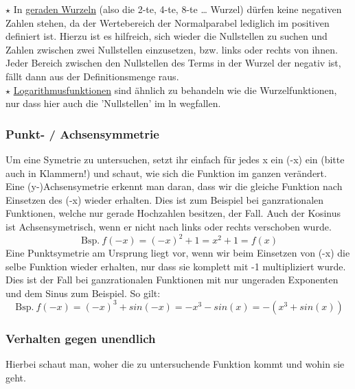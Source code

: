 		\(\star\) In \underline{geraden Wurzeln} (also die 2-te, 4-te, 8-te \ldots
		Wurzel) dürfen keine negativen Zahlen stehen, da der Wertebereich der
		Normalparabel lediglich im positiven definiert ist. Hierzu ist es hilfreich,
		sich wieder die Nullstellen zu suchen und Zahlen zwischen zwei Nullstellen
		einzusetzen, bzw. links oder rechts von ihnen. Jeder Bereich zwischen den
		Nullstellen des Terms in der Wurzel der negativ ist, fällt dann aus der
		Definitionsmenge raus.\\

		\(\star\) \underline{Logarithmusfunktionen} sind ähnlich zu behandeln wie die
		Wurzelfunktionen, nur dass hier auch die 'Nullstellen' im ln wegfallen.

	\subsubsection{Punkt- / Achsensymmetrie}
		Um eine Symetrie zu untersuchen, setzt ihr einfach für jedes x ein (-x) ein
		(bitte auch in Klammern!) und schaut, wie sich die Funktion im ganzen
		verändert.\\
		Eine (y-)Achsensymetrie erkennt man daran, dass wir die gleiche Funktion nach
		Einsetzen des (-x) wieder erhalten. Dies ist zum Beispiel bei ganzrationalen
		Funktionen, welche nur gerade Hochzahlen besitzen, der Fall. Auch der Kosinus
		ist Achsensymetrisch, wenn er nicht nach links oder rechts verschoben wurde.
		\formel{\[f(-x)=f(x),\]}
		\[\mathrm{\ Bsp.\ } f(-x)=(-x)^2+1=x^2+1=f(x)\]
		Eine Punktsymetrie am Ursprung liegt vor, wenn wir beim Einsetzen von (-x) die
		selbe Funktion wieder erhalten, nur dass sie komplett mit -1 multipliziert
		wurde. Dies ist der Fall bei ganzrationalen Funktionen mit nur ungeraden
		Exponenten und dem Sinus zum Beispiel. So gilt:
		\formel{\[f(-x)=-f(x),\]}
		\[\mathrm{\ Bsp.\ }
		f(-x)=(-x)^3+sin(-x)=-x^3-sin(x)=-(x^3+sin(x))\]

	\subsubsection{Verhalten gegen unendlich}
		Hierbei schaut man, woher die zu untersuchende Funktion kommt und wohin sie
		geht.\\

